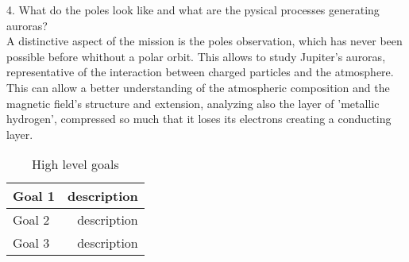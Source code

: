 4. What do the poles look like and what are the pysical processes generating auroras?\\
A distinctive aspect of the mission is the poles observation, which has never been possible before whithout a polar orbit. This allows to study Jupiter's auroras, representative of the interaction between charged particles and the atmosphere. This can allow a better understanding of the atmospheric composition and the magnetic field's structure and extension, analyzing also the layer of 'metallic hydrogen', compressed so much that it loses its electrons creating a conducting layer. \\


\renewcommand{\arraystretch}{1.5}
\begin{table}[H]
    \centering
    \begin{tabular}{|l|r|}
      
        \hline
        Goal 1 & description \\ 
        \hline
        Goal 2 & description \\ 
        \hline
        Goal 3 & description \\ 
        \hline
     
    \end{tabular}
    \centering
    \caption{High level goals}
    \label{tab:High level goals}
\end{table}

\renewcommand{\arraystretch}{1}

